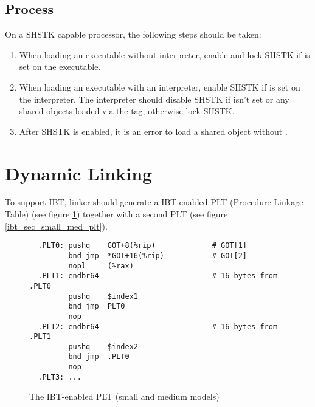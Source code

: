 \subsection{Process }
\label{shstk}

On a SHSTK capable processor, the following steps should be taken:

\begin{enumerate}
  \item
    When loading an executable without interpreter, enable and lock
    SHSTK if  is set on the
    executable.
  \item
    \begin{sloppypar}
      When loading an executable with an interpreter, enable SHSTK if
       is set on the interpreter.
      The interpreter should disable SHSTK if
       isn't set or any shared
      objects loaded via the  tag, otherwise lock SHSTK.
   \end{sloppypar}
  \item After SHSTK is enabled, it is an error to load a shared object
    without .
\end{enumerate}

\section{Dynamic Linking}

To support IBT, linker should generate a IBT-enabled PLT (Procedure
Linkage Table) (see figure \ref{ibt_small_med_plt}) together with a second
PLT (see figure \ref{ibt_sec_small_med_plt}).

\begin{figure}[H]
\Hrule
\caption{The IBT-enabled PLT (small and medium models)}
\label{ibt_small_med_plt}
\begin{footnotesize}
\begin{verbatim}
  .PLT0: pushq    GOT+8(%rip)             # GOT[1]
         bnd jmp  *GOT+16(%rip)           # GOT[2]
         nopl     (%rax)
  .PLT1: endbr64                          # 16 bytes from .PLT0
         pushq    $index1
         bnd jmp  PLT0
         nop
  .PLT2: endbr64                          # 16 bytes from .PLT1
         pushq    $index2
         bnd jmp  .PLT0
         nop
  .PLT3: ...
\end{verbatim}%
\end{footnotesize}
\Hrule
\end{figure}

